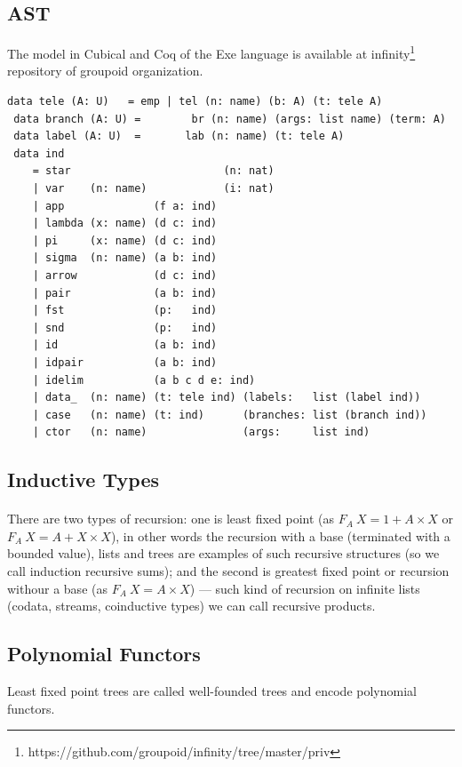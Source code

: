 \documentclass[11pt,oneside]{article}
\begin{document}
\subsection{AST}

The model in Cubical and Coq of the Exe language is available at
infinity\footnote{https://github.com/groupoid/infinity/tree/master/priv}
repository of groupoid organization.

\begin{lstlisting}[mathescape=true]
 data tele (A: U)   = emp | tel (n: name) (b: A) (t: tele A)
 data branch (A: U) =        br (n: name) (args: list name) (term: A)
 data label (A: U)  =       lab (n: name) (t: tele A)
 data ind
    = star                        (n: nat)
    | var    (n: name)            (i: nat)
    | app              (f a: ind)
    | lambda (x: name) (d c: ind)
    | pi     (x: name) (d c: ind)
    | sigma  (n: name) (a b: ind)
    | arrow            (d c: ind)
    | pair             (a b: ind)
    | fst              (p:   ind)
    | snd              (p:   ind)
    | id               (a b: ind)
    | idpair           (a b: ind)
    | idelim           (a b c d e: ind)
    | data_  (n: name) (t: tele ind) (labels:   list (label ind))
    | case   (n: name) (t: ind)      (branches: list (branch ind))
    | ctor   (n: name)               (args:     list ind)
\end{lstlisting}



\newpage
\subsection{Inductive Types}

\paragraph{}
There are two types of recursion: one is least fixed point (as $F_A\ X = 1 + A\times X$
or $F_A\ X = A + X\times X$), in other words the recursion with a base (terminated with a bounded value),
lists and trees are examples of such recursive structures (so we call induction recursive sums);
and the second is greatest fixed point or recursion withour a base (as $F_A\ X = A\times X $) ---
such kind of recursion on infinite lists (codata, streams, coinductive types) we can call recursive products.\\

\subsection{Polynomial Functors}
Least fixed point trees are called well-founded trees and encode polynomial functors.\\
\end{document}
